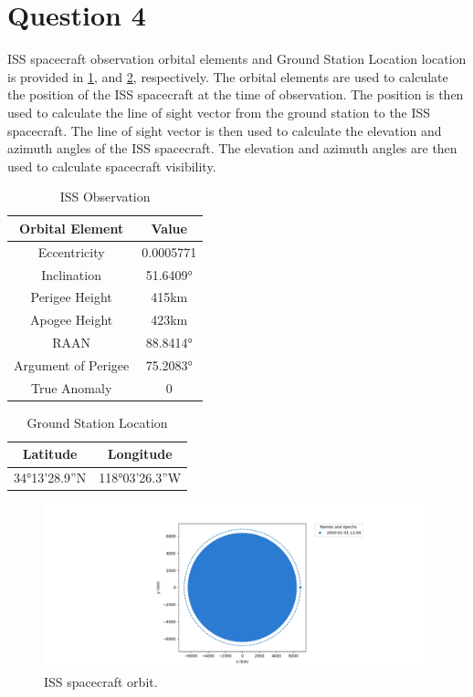 \section{Question 4}
ISS spacecraft observation orbital elements and Ground Station Location location is provided in \ref{table:orbital-elements}, and \ref{table:lat-long}, respectively. The orbital elements are used to calculate the position of the ISS spacecraft at the time of observation. The position is then used to calculate the line of sight vector from the ground station to the ISS spacecraft. The line of sight vector is then used to calculate the elevation and azimuth angles of the ISS spacecraft. The elevation and azimuth angles are then used to calculate spacecraft visibility.
\begin{table}[H]
    \centering
    \label{table:orbital-elements}
    \Tstrut
    \begin{tabular}{|c|c|}
    \hline
    Orbital Element & Value \\
    \hline
    Eccentricity & 0.0005771 \\
    Inclination & \ang{51.6409} \\
    Perigee Height & 415km \\
    Apogee Height & 423km \\
    RAAN & \ang{88.8414} \\
    Argument of Perigee & \ang{75.2083} \\
    True Anomaly & 0 \\
    \hline
    \end{tabular}
    \caption{ISS Observation}
\end{table}

\begin{table}[H]
    \centering
    \label{table:lat-long}
    \begin{tabular}{|c|c|}
    \hline
    Latitude & Longitude \\
    \hline
    \ang{34}13'28.9''N & \ang{118}03'26.3''W \\
    \hline
    \end{tabular}
    \caption{Ground Station Location}
\end{table}

\begin{figure}[H]
    \centering
    \includegraphics[width=\textwidth]{../Figure/Q4/orbiral.png}
    \caption{ISS spacecraft orbit.}
    \label{fig:ISS_orbit}
\end{figure}

